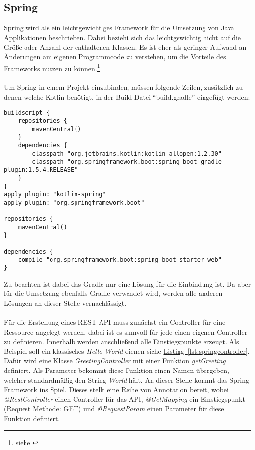 \subsection{Spring}\label{sec:bibspring}
Spring wird als ein leichtgewichtiges Framework für die Umsetzung von Java Applikationen beschrieben. Dabei bezieht sich das leichtgewichtig nicht auf die Größe oder Anzahl der enthaltenen Klassen. Es ist eher als geringer Aufwand an Änderungen am eigenen Programmcode zu verstehen, um die Vorteile des Frameworks nutzen zu können.\footnote{siehe \cite{proSpring5}}\\
\\
Um Spring in einem Projekt einzubinden, müssen folgende Zeilen, zusätzlich zu denen welche Kotlin benötigt, in der Build-Datei \enquote{build.gradle} eingefügt werden:
\begin{lstlisting}[style=lstStyleFramed, caption={Einbindung des Spring Framework mithilfe von Gradle}]
buildscript {
	repositories {
		mavenCentral()
	}
	dependencies {
		classpath "org.jetbrains.kotlin:kotlin-allopen:1.2.30"
		classpath "org.springframework.boot:spring-boot-gradle-plugin:1.5.4.RELEASE"
	}
}
apply plugin: "kotlin-spring"
apply plugin: "org.springframework.boot"

repositories {
	mavenCentral()
}

dependencies {
	compile "org.springframework.boot:spring-boot-starter-web"
}
\end{lstlisting}
Zu beachten ist dabei das Gradle nur eine Lösung für die Einbindung ist. Da aber für die Umsetzung ebenfalls Gradle verwendet wird, werden alle anderen Lösungen an dieser Stelle vernachlässigt.\\
\\ 
Für die Erstellung eines \gls{REST} \gls{API} muss zunächst ein Controller für eine Ressource angelegt werden, dabei ist es sinnvoll für jede einen eigenen Controller zu definieren. Innerhalb werden anschließend alle Einstiegspunkte erzeugt. Als Beispiel soll ein klassisches \textit{Hello World} dienen siehe \hyperref[lst:springcontroller]{Listing~\ref{lst:springcontroller}}. Dafür wird eine Klasse \textit{GreetingController} mit einer Funktion \textit{getGreeting} definiert. Als Parameter bekommt diese Funktion einen Namen übergeben, welcher standardmäßig den String \textit{World} hält. An dieser Stelle kommt das Spring Framework ins Spiel. Dieses stellt eine Reihe von Annotation bereit, wobei \textit{@RestController} einen Controller für das \gls{API}, \textit{@GetMapping} ein Einstiegspunkt (Request Methode: GET) und \textit{@RequestParam} einen Parameter für diese Funktion definiert. 
